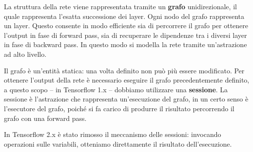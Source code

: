 \documentclass[a4paper,oneside]{book}
\begin{document}
    La struttura della rete viene rappresentata tramite un \textbf{grafo} unidirezionale,
    il quale rappresenta l'esatta successione dei layer. 
    Ogni nodo del grafo rappresenta un layer. Questo consente in modo efficiente
    sia di percorrere il grafo per ottenere l'output in fase di forward pass,
    sia di recuperare le dipendenze tra i diversi layer in fase di backward pass.
    In questo modo si modella la rete tramite un'astrazione ad alto livello.

    Il grafo è un'entità statica: una volta definito non può più essere modificato.
    Per ottenere l'output della rete è necessario eseguire il grafo precedentemente definito, 
    a questo scopo -- in Tensorflow 1.x -- dobbiamo utilizzare una \textbf{sessione}. La sessione
    è l'astrazione che rappresenta un'esecuzione del grafo, in un certo senso
    è l'esecutore del grafo, poiché si fa carico di produrre il risultato
    percorrendo il grafo con una forward pass.

    In Tensorflow 2.x è stato rimosso il meccanismo delle sessioni: invocando
    operazioni sulle variabili, otteniamo direttamente il risultato dell'esecuzione.
     
\end{document}
